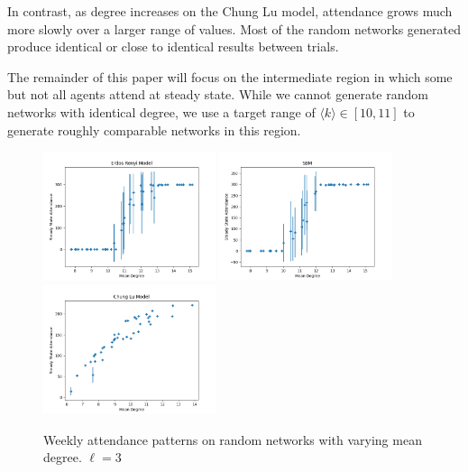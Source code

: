 \documentclass[12pt]{article}
\begin{document}
In contrast, as degree increases on the Chung Lu model, attendance grows much more slowly over a larger range of values.  Most of the random networks generated produce identical or close to identical results between trials.

The remainder of this paper will focus on the intermediate region in which some but not all agents attend at steady state.  While we cannot generate random networks with identical degree, we use a target range of $\langle k \rangle \in [10, 11]$ to generate roughly comparable networks in this region.

\begin{figure}
  \includegraphics[width=0.45\textwidth]{erdos_renyi_degree.png}
  \includegraphics[width=0.45\textwidth]{sbm_degree.png}
  \includegraphics[width=0.45\textwidth]{chung_lu_degree.png}
  \caption{Weekly attendance patterns on random networks with varying mean degree.  $\ell = 3$}
\end{figure}
\end{document}
